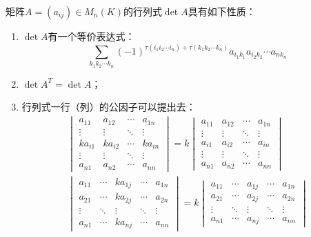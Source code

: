 \begin{property}\label{prop:Determinant}
	矩阵$A=(a_{ij})\in M_{n}(K)$的行列式$\det A$具有如下性质：
	\begin{enumerate}
		\item $\det A$有一个等价表达式：
		\begin{equation*}
			\sum_{k_1k_2\cdots k_n}^{}(-1)^{\tau(i_1i_2\cdots i_n)+\tau(k_1k_2\cdots k_n)}a_{i_1k_1}a_{i_2k_2}\cdots a_{nk_n}
		\end{equation*}
		\item $\det A^T=\det A$；
		\item 行列式一行（列）的公因子可以提出去：
		\begin{gather*}
			\begin{vmatrix}
				a_{11} & a_{12} & \cdots & a_{1n} \\
				\vdots & \vdots & \ddots & \vdots \\
				ka_{i1} & ka_{i2} & \cdots & ka_{in} \\
				\vdots & \vdots & \ddots & \vdots \\
				a_{n1} & a_{n2} & \cdots & a_{nn}
			\end{vmatrix}=k
			\begin{vmatrix}
				a_{11} & a_{12} & \cdots & a_{1n} \\
				\vdots & \vdots & \ddots & \vdots \\
				a_{i1} & a_{i2} & \cdots & a_{in} \\
				\vdots & \vdots & \ddots & \vdots \\
				a_{n1} & a_{n2} & \cdots & a_{nn}
			\end{vmatrix} \\
			\begin{vmatrix}
				a_{11} & \cdots & ka_{1j} & \cdots & a_{1n} \\
				a_{21} & \cdots & ka_{2j} & \cdots & a_{2n} \\
				\vdots & \ddots & \vdots & \ddots & \vdots \\
				a_{n1} & \cdots & ka_{nj} & \cdots & a_{nn}
			\end{vmatrix}=k
			\begin{vmatrix}
				a_{11} & \cdots & a_{1j} & \cdots & a_{1n} \\
				a_{21} & \cdots & a_{2j} & \cdots & a_{2n} \\
				\vdots & \ddots & \vdots & \ddots & \vdots \\
				a_{n1} & \cdots & a_{nj} & \cdots & a_{nn}
			\end{vmatrix}
		\end{gather*}

\end{enumerate}
\end{property}
